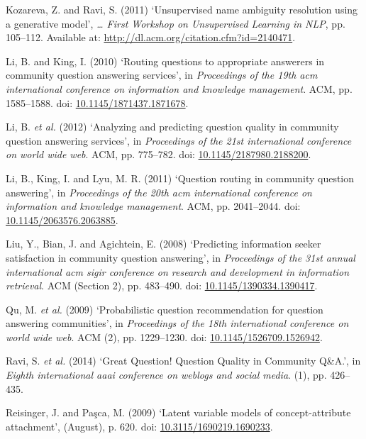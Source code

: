\documentclass[11pt,preprint, authoryear]{article}
\numberwithin{equation}{section}
\begin{document}
\hypertarget{ref-Kozareva2011}{}
Kozareva, Z. and Ravi, S. (2011) `Unsupervised name ambiguity resolution
using a generative model', \emph{\ldots{} First Workshop on Unsupervised
Learning in NLP}, pp. 105--112. Available at:
\url{http://dl.acm.org/citation.cfm?id=2140471}.

\hypertarget{ref-Li2010}{}
Li, B. and King, I. (2010) `Routing questions to appropriate answerers
in community question answering services', in \emph{Proceedings of the
19th acm international conference on information and knowledge
management}. ACM, pp. 1585--1588. doi:
\href{https://doi.org/10.1145/1871437.1871678}{10.1145/1871437.1871678}.

\hypertarget{ref-Li2012}{}
Li, B. \emph{et al.} (2012) `Analyzing and predicting question quality
in community question answering services', in \emph{Proceedings of the
21st international conference on world wide web}. ACM, pp. 775--782.
doi:
\href{https://doi.org/10.1145/2187980.2188200}{10.1145/2187980.2188200}.

\hypertarget{ref-Li2011}{}
Li, B., King, I. and Lyu, M. R. (2011) `Question routing in community
question answering', in \emph{Proceedings of the 20th acm international
conference on information and knowledge management}. ACM, pp.
2041--2044. doi:
\href{https://doi.org/10.1145/2063576.2063885}{10.1145/2063576.2063885}.

\hypertarget{ref-Liu2008}{}
Liu, Y., Bian, J. and Agichtein, E. (2008) `Predicting information
seeker satisfaction in community question answering', in
\emph{Proceedings of the 31st annual international acm sigir conference
on research and development in information retrieval}. ACM (Section 2),
pp. 483--490. doi:
\href{https://doi.org/10.1145/1390334.1390417}{10.1145/1390334.1390417}.

\hypertarget{ref-Qu2009}{}
Qu, M. \emph{et al.} (2009) `Probabilistic question recommendation for
question answering communities', in \emph{Proceedings of the 18th
international conference on world wide web}. ACM (2), pp. 1229--1230.
doi:
\href{https://doi.org/10.1145/1526709.1526942}{10.1145/1526709.1526942}.

\hypertarget{ref-Ravi2014}{}
Ravi, S. \emph{et al.} (2014) `Great Question! Question Quality in
Community Q\&A.', in \emph{Eighth international aaai conference on
weblogs and social media}. (1), pp. 426--435.

\hypertarget{ref-Reisinger2009}{}
Reisinger, J. and Paşca, M. (2009) `Latent variable models of
concept-attribute attachment', (August), p. 620. doi:
\href{https://doi.org/10.3115/1690219.1690233}{10.3115/1690219.1690233}.
\end{document}

